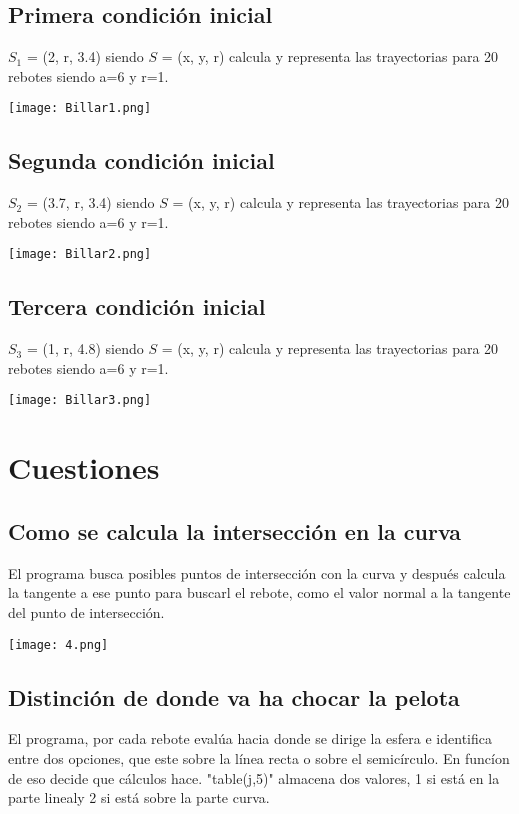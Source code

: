 \documentclass{article}
\begin{document}
\subsection{Primera condición inicial}
$S_1$ = (2, r, 3.4) siendo $S$ = (x, y, r) calcula y representa las trayectorias para 20 rebotes siendo a=6 y r=1.
\begin{center}
        \texttt{[image: Billar1.png]}
\end{center}

\subsection{Segunda condición inicial}
$S_2$ = (3.7, r, 3.4) siendo $S$ = (x, y, r) calcula y representa las trayectorias para 20 rebotes siendo a=6 y r=1.
\begin{center}
        \texttt{[image: Billar2.png]}
\end{center}

\subsection{Tercera condición inicial}
$S_3$ = (1, r, 4.8) siendo $S$ = (x, y, r) calcula y representa las trayectorias para 20 rebotes siendo a=6 y r=1.
\begin{center}
        \texttt{[image: Billar3.png]}
\end{center}


\section{Cuestiones}
\subsection{Como se calcula la intersección en la curva}
El programa busca posibles puntos de intersección con la curva y después calcula la tangente a ese punto para buscarl el rebote, como el valor normal a la tangente del punto de intersección.
\begin{center}
        \texttt{[image: 4.png]}
\end{center}

\newpage

\subsection{Distinción de donde va ha chocar la pelota}
El programa, por cada rebote evalúa hacia donde se dirige la esfera e identifica entre dos opciones, que este sobre la línea recta o sobre el semicírculo. En funcíon de eso decide que cálculos hace. "table(j,5)" almacena dos valores, 1 si está en la parte linealy 2 si está sobre la parte curva.
\end{document}
